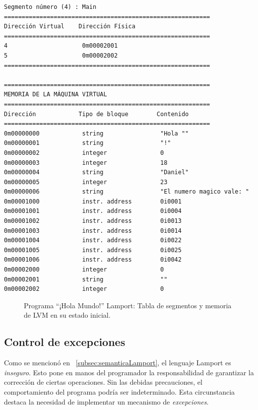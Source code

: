 \begin{verbatim}
Segmento número (4) : Main
==========================================================
Dirección Virtual    Dirección Física    
==========================================================
4                     0m00002001            
5                     0m00002002            
==========================================================

==========================================================
MEMORIA DE LA MÁQUINA VIRTUAL
==========================================================
Dirección            Tipo de bloque        Contenido             
==========================================================
0m00000000            string                "Hola ""             
0m00000001            string                "!"                 
0m00000002            integer               0                     
0m00000003            integer               18                    
0m00000004            string                "Daniel"            
0m00000005            integer               23                    
0m00000006            string                "El numero magico vale: "
0m00001000            instr. address        0i0001                
0m00001001            instr. address        0i0004                
0m00001002            instr. address        0i0013                
0m00001003            instr. address        0i0014                
0m00001004            instr. address        0i0022                
0m00001005            instr. address        0i0025                
0m00001006            instr. address        0i0042                
0m00002000            integer               0                     
0m00002001            string                ""                    
0m00002002            integer               0                     
\end{verbatim}
\begin{figure}[hbtp]
\caption{Programa ``¡Hola Mundo!'' Lamport: Tabla de segmentos y memoria de LVM en su estado inicial.}
\label{fig:preLVMHolaMundo}
\end{figure}

\subsection{Control de excepciones}
Como se mencionó en ~\ref{subsec:semanticaLamport}, el lenguaje Lamport es \textit{inseguro}. Esto pone en manos del programador la responsabilidad de garantizar la corrección de ciertas operaciones. Sin las debidas precauciones, el comportamiento del programa podría ser indeterminado. Esta circunstancia destaca la necesidad de implementar un mecanismo de \textit{excepciones}.


